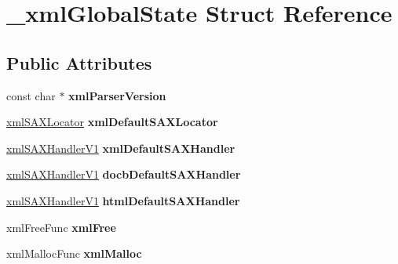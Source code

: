 \hypertarget{struct__xmlGlobalState}{
\section{\_\-xmlGlobalState Struct Reference}
\label{struct__xmlGlobalState}
}
\subsection*{Public Attributes}
\begin{DoxyCompactItemize}
\item 
\hypertarget{struct__xmlGlobalState_a4af471a525f9377b8bb130c3ec631ba8}{
const char $\ast$ {\bfseries xmlParserVersion}}
\label{struct__xmlGlobalState_a4af471a525f9377b8bb130c3ec631ba8}

\item 
\hypertarget{struct__xmlGlobalState_aed1adc9856d172d3de5d036f072cbb1a}{
\hyperlink{struct__xmlSAXLocator}{xmlSAXLocator} {\bfseries xmlDefaultSAXLocator}}
\label{struct__xmlGlobalState_aed1adc9856d172d3de5d036f072cbb1a}

\item 
\hypertarget{struct__xmlGlobalState_a256cd5324f2a89b49e0139c5c8e39ea1}{
\hyperlink{struct__xmlSAXHandlerV1}{xmlSAXHandlerV1} {\bfseries xmlDefaultSAXHandler}}
\label{struct__xmlGlobalState_a256cd5324f2a89b49e0139c5c8e39ea1}

\item 
\hypertarget{struct__xmlGlobalState_a2450ebc67fb96e53f0df344907da8f48}{
\hyperlink{struct__xmlSAXHandlerV1}{xmlSAXHandlerV1} {\bfseries docbDefaultSAXHandler}}
\label{struct__xmlGlobalState_a2450ebc67fb96e53f0df344907da8f48}

\item 
\hypertarget{struct__xmlGlobalState_a07e7a66e908fa0aef7bfa9a42e1b2cb7}{
\hyperlink{struct__xmlSAXHandlerV1}{xmlSAXHandlerV1} {\bfseries htmlDefaultSAXHandler}}
\label{struct__xmlGlobalState_a07e7a66e908fa0aef7bfa9a42e1b2cb7}

\item 
\hypertarget{struct__xmlGlobalState_a842b3e02678910e93737a0c9c520d454}{
xmlFreeFunc {\bfseries xmlFree}}
\label{struct__xmlGlobalState_a842b3e02678910e93737a0c9c520d454}

\item 
\hypertarget{struct__xmlGlobalState_aa4f9f1f20f477d6d6b108e6ecf7c4561}{
xmlMallocFunc {\bfseries xmlMalloc}}
\label{struct__xmlGlobalState_aa4f9f1f20f477d6d6b108e6ecf7c4561}


\end{DoxyCompactItemize}
